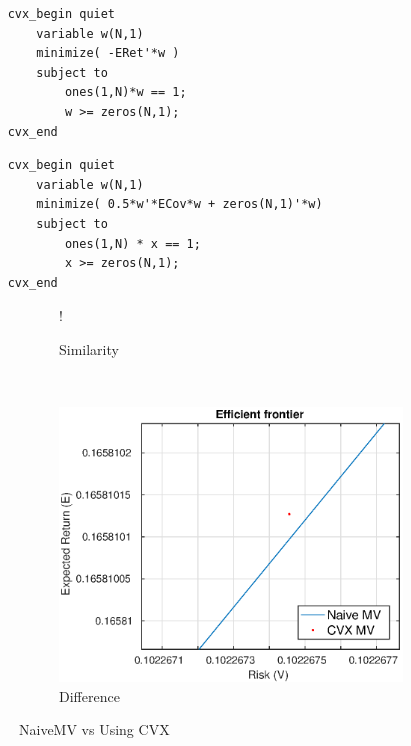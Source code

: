 \documentclass[11pt]{article}
\begin{document}
\begin{minipage}{.4\textwidth}
  	\begin{verbatim}
	cvx_begin quiet
		variable w(N,1)
		minimize( -ERet'*w )
		subject to
			ones(1,N)*w == 1;
			w >= zeros(N,1);
	cvx_end
	\end{verbatim}
\end{minipage}%
\begin{minipage}{.6\textwidth}
  	\begin{verbatim}
	cvx_begin quiet
		variable w(N,1)
		minimize( 0.5*w'*ECov*w + zeros(N,1)'*w)
		subject to
			ones(1,N) * x == 1;
			x >= zeros(N,1);
	cvx_end
	\end{verbatim}
\end{minipage}

\begin{figure}[!h]
    \centering 
   \begin{subfigure}[b]{0.30\textwidth}
     	\resizebox {\textwidth} {!} { }
     \caption{Similarity}
    \label{fig:q1-d-naive-v-cvx}
    \end{subfigure}
    ~
    \begin{subfigure}[b]{0.30\textwidth}
       	\includegraphics[scale=.5] {q1_d_naive_v_cvx_difference.eps}
       \caption{Difference}
        \label{fig:q1-d-naive-v-cvx-difference}
    \end{subfigure}
    \caption{NaiveMV vs Using CVX}\label{fig:naive_v_cvx}
\end{figure}
\end{document}
